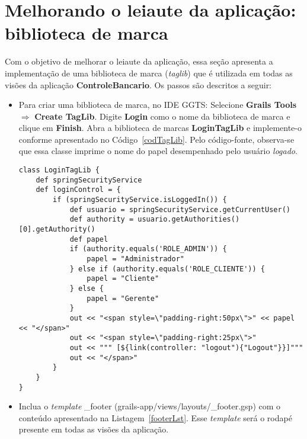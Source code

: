 \newpage

\section{Melhorando o leiaute da aplicação: biblioteca de marca}

\vspace{0.3cm}

Com  o objetivo  de melhorar  o  leiaute da  aplicação, essa  seção apresenta  a
implementação de uma biblioteca de marca ({\it taglib}) que é utilizada em todas
as visões da aplicação {\bf ControleBancario}. Os passos são descritos a seguir: 

\begin{itemize}

\vspace{0.3cm}

\item Para  criar uma biblioteca  de marca, no  IDE GGTS: Selecione  {\bf Grails
  Tools} $\Longrightarrow$ {\bf Create TagLib}.   Digite {\bf Login} como o nome
  da biblioteca de  marca e clique em {\bf Finish}. Abra  a biblioteca de marcas
  {\bf     LoginTagLib}    e     implemente-o     conforme    apresentado     no
  Código~\ref{codTagLib}.  Pelo código-fonte, observa-se que essa classe imprime
  o nome do papel desempenhado pelo usuário {\it logado}.  

\begin{lstlisting}[caption=Biblioteca  de marca  {\bf  LoginTagLib}, frame=trBL,
    float=htbp, label=codTagLib] 
class LoginTagLib {
    def springSecurityService
    def loginControl = {
        if (springSecurityService.isLoggedIn()) {
            def usuario = springSecurityService.getCurrentUser() 
            def authority = usuario.getAuthorities()[0].getAuthority()
            def papel
            if (authority.equals('ROLE_ADMIN')) {
                papel = "Administrador"
            } else if (authority.equals('ROLE_CLIENTE')) {
                papel = "Cliente"
            } else {
                papel = "Gerente"
            }
            out << "<span style=\"padding-right:50px\">" << papel << "</span>"
            out << "<span style=\"padding-right:25px\">"
            out << """ [${link(controller: "logout"){"Logout"}}]"""
            out << "</span>"
        }
    }
}
\end{lstlisting}

\item Inclua o  {\it template} \_footer (grails-app/views/layouts/\_footer.gsp)
  com o  conteúdo apresentado  na Listagem~\ref{footerLst}. Esse  {\it template}
  será o rodapé presente em todas as visões da aplicação.


\end{itemize}
